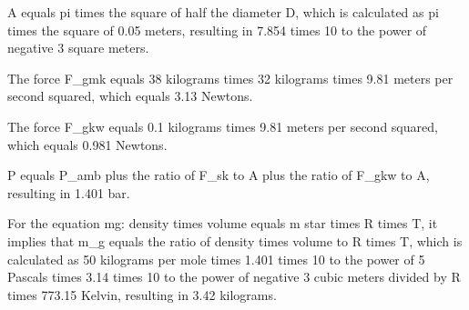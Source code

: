 A equals pi times the square of half the diameter D, which is calculated as pi times the square of 0.05 meters, resulting in 7.854 times 10 to the power of negative 3 square meters.

The force F_gmk equals 38 kilograms times 32 kilograms times 9.81 meters per second squared, which equals 3.13 Newtons.

The force F_gkw equals 0.1 kilograms times 9.81 meters per second squared, which equals 0.981 Newtons.

P equals P_amb plus the ratio of F_sk to A plus the ratio of F_gkw to A, resulting in 1.401 bar.

For the equation mg: density times volume equals m star times R times T, it implies that m_g equals the ratio of density times volume to R times T, which is calculated as 50 kilograms per mole times 1.401 times 10 to the power of 5 Pascals times 3.14 times 10 to the power of negative 3 cubic meters divided by R times 773.15 Kelvin, resulting in 3.42 kilograms.